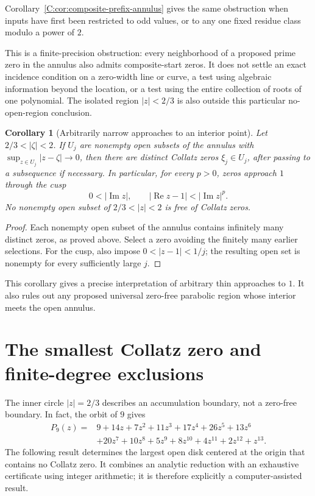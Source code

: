 \documentclass[11pt,a4paper]{article}
\newtheorem{corollary}[theorem]{Corollary}
\theoremstyle{definition}
\theoremstyle{remark}
\numberwithin{equation}{section}
\begin{document}
Corollary~\ref{C:cor:composite-prefix-annulus} gives the same obstruction
when inputs have first been restricted to odd values, or to any one
fixed residue class modulo a power of $2$.

This is a finite-precision obstruction: every neighborhood of a proposed
prime zero in the annulus also admits composite-start zeros. It does not
settle an exact incidence condition on a zero-width line or curve, a test
using algebraic information beyond the location, or a test using the
entire collection of roots of one polynomial. The isolated region
$|z|<2/3$ is also outside this particular no-open-region conclusion.


\begin{corollary}[Arbitrarily narrow approaches to an interior point]
\label{C:cor:ucz-cusps}
Let $2/3<|\zeta|<2$. If $U_j$ are nonempty open subsets of the annulus
with $\sup_{z\in U_j}|z-\zeta|\to0$, then there are distinct Collatz
zeros $\xi_j\in U_j$, after passing to a subsequence if necessary.
In particular, for every $p>0$, zeros approach $1$ through the cusp
\[
 0<|\operatorname{Im}z|,\qquad
 |\operatorname{Re}z-1|<|\operatorname{Im}z|^p.
\]
No nonempty open subset of $2/3<|z|<2$ is free of Collatz zeros.
\end{corollary}
\begin{proof}
Each nonempty open subset of the annulus contains infinitely many
distinct zeros, as proved above. Select a zero avoiding the finitely
many earlier selections. For the cusp, also impose
$0<|z-1|<1/j$; the resulting open set is nonempty for every sufficiently
large $j$.
\end{proof}

This corollary gives a precise interpretation of arbitrary thin
approaches to $1$. It also rules out any proposed universal zero-free
parabolic region whose interior meets the open annulus.


\section{The smallest Collatz zero and finite-degree exclusions}
\label{C:subsec:smallest-collatz-zero}

The inner circle $|z|=2/3$ describes an accumulation boundary, not a
zero-free boundary. In fact, the orbit of $9$ gives
\begin{align*}
P_9(z)={}&9+14z+7z^2+11z^3+17z^4+26z^5+13z^6\\
 &+20z^7+10z^8+5z^9+8z^{10}+4z^{11}+2z^{12}+z^{13}.
\end{align*}
The following result determines the largest open disk centered at the
origin that contains no Collatz zero. It combines an analytic reduction
with an exhaustive certificate using integer arithmetic; it is therefore
explicitly a computer-assisted result.
\end{document}
